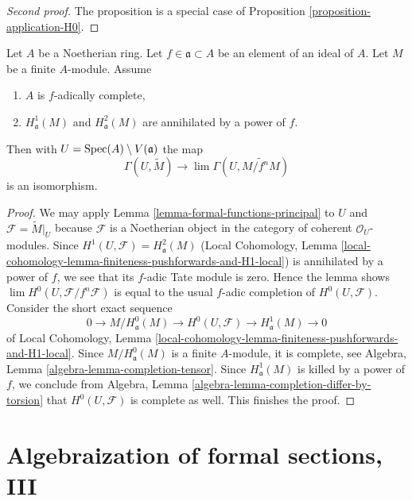 \begin{proof}[Second proof]
The proposition is a special case of
Proposition \ref{proposition-application-H0}.
\end{proof}

\begin{lemma}
\label{lemma-alternative-H0}
Let $A$ be a Noetherian ring. Let $f \in \mathfrak a \subset A$
be an element of an ideal of $A$. Let $M$ be a finite $A$-module.
Assume
\begin{enumerate}
\item $A$ is $f$-adically complete,
\item $H^1_\mathfrak a(M)$ and $H^2_\mathfrak a(M)$ are
annihilated by a power of $f$.
\end{enumerate}
Then with $U = \mathop{\mathrm{Spec}}(A) \setminus V(\mathfrak a)$ the map
$$
\Gamma(U, \widetilde{M})
\longrightarrow
\lim \Gamma(U, \widetilde{M/f^nM})
$$
is an isomorphism.
\end{lemma}

\begin{proof}
We may apply Lemma \ref{lemma-formal-functions-principal} to $U$ and
$\mathcal{F} = \widetilde{M}|_U$ because $\mathcal{F}$ is a Noetherian object in
the category of coherent $\mathcal{O}_U$-modules.
Since $H^1(U, \mathcal{F}) = H^2_\mathfrak a(M)$
(Local Cohomology, Lemma
\ref{local-cohomology-lemma-finiteness-pushforwards-and-H1-local})
is annihilated by a power of $f$, we see that
its $f$-adic Tate module is zero.
Hence the lemma shows $\lim H^0(U, \mathcal{F}/f^n \mathcal{F})$
is equal to the usual $f$-adic completion of $H^0(U, \mathcal{F})$.
Consider the short exact sequence
$$
0 \to M/H^0_\mathfrak a(M) \to H^0(U, \mathcal{F}) \to H^1_\mathfrak a(M) \to 0
$$
of Local Cohomology, Lemma
\ref{local-cohomology-lemma-finiteness-pushforwards-and-H1-local}.
Since $M/H^0_\mathfrak a(M)$ is a finite $A$-module, it is
complete, see Algebra, Lemma \ref{algebra-lemma-completion-tensor}.
Since $H^1_\mathfrak a(M)$ is killed by a power of $f$, we conclude
from Algebra, Lemma \ref{algebra-lemma-completion-differ-by-torsion}
that $H^0(U, \mathcal{F})$ is complete as well. This finishes the proof.
\end{proof}







\section{Algebraization of formal sections, III}
\label{section-algebraization-sections-coherent-III}

